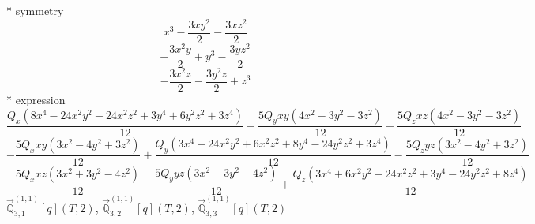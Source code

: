\documentclass[fleqn,8pt]{jsarticle}
\begin{document}
\noindent\quad ** symmetry
\begin{dmath*}
x^{3} - \frac{3 x y^{2}}{2} - \frac{3 x z^{2}}{2}
\end{dmath*}
\begin{dmath*}
- \frac{3 x^{2} y}{2} + y^{3} - \frac{3 y z^{2}}{2}
\end{dmath*}
\begin{dmath*}
- \frac{3 x^{2} z}{2} - \frac{3 y^{2} z}{2} + z^{3}
\end{dmath*}
\noindent\quad ** expression
\begin{dmath*}
\frac{Q_{x} \left(8 x^{4} - 24 x^{2} y^{2} - 24 x^{2} z^{2} + 3 y^{4} + 6 y^{2} z^{2} + 3 z^{4}\right)}{12} + \frac{5 Q_{y} x y \left(4 x^{2} - 3 y^{2} - 3 z^{2}\right)}{12} + \frac{5 Q_{z} x z \left(4 x^{2} - 3 y^{2} - 3 z^{2}\right)}{12}
\end{dmath*}
\begin{dmath*}
- \frac{5 Q_{x} x y \left(3 x^{2} - 4 y^{2} + 3 z^{2}\right)}{12} + \frac{Q_{y} \left(3 x^{4} - 24 x^{2} y^{2} + 6 x^{2} z^{2} + 8 y^{4} - 24 y^{2} z^{2} + 3 z^{4}\right)}{12} - \frac{5 Q_{z} y z \left(3 x^{2} - 4 y^{2} + 3 z^{2}\right)}{12}
\end{dmath*}
\begin{dmath*}
- \frac{5 Q_{x} x z \left(3 x^{2} + 3 y^{2} - 4 z^{2}\right)}{12} - \frac{5 Q_{y} y z \left(3 x^{2} + 3 y^{2} - 4 z^{2}\right)}{12} + \frac{Q_{z} \left(3 x^{4} + 6 x^{2} y^{2} - 24 x^{2} z^{2} + 3 y^{4} - 24 y^{2} z^{2} + 8 z^{4}\right)}{12}
\end{dmath*}
\noindent\quad $\vec{\mathbb{Q}}_{3,1}^{(1,1)}[q](T,2)$, $\vec{\mathbb{Q}}_{3,2}^{(1,1)}[q](T,2)$, $\vec{\mathbb{Q}}_{3,3}^{(1,1)}[q](T,2)$
\end{document}
